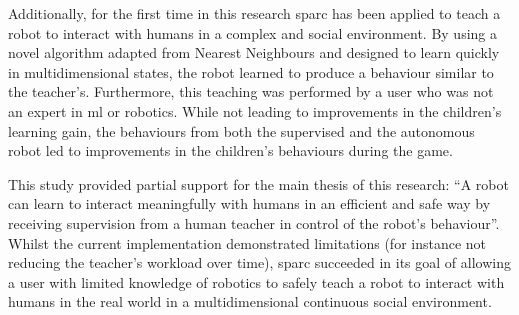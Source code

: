 
Additionally, for the first time in this research \gls{sparc} has been applied to teach a robot to interact with humans in a complex and social environment. By using a novel algorithm adapted from Nearest Neighbours and designed to learn quickly in multidimensional states, the robot learned to produce a behaviour similar to the teacher's. Furthermore, this teaching was performed by a user who was not an expert in \gls{ml} or robotics. While not leading to improvements in the children's learning gain, the behaviours from both the supervised and the autonomous robot led to improvements in the children's behaviours during the game. 

This study provided partial support for the main thesis of this research: ``A robot can learn to interact meaningfully with humans in an efficient and safe way by receiving supervision from a human teacher in control of the robot's behaviour''. Whilst the current implementation demonstrated limitations (for instance not reducing the teacher's workload over time), \gls{sparc} succeeded in its goal of allowing a user with limited knowledge of robotics to safely teach a robot to interact with humans in the real world in a multidimensional continuous social environment. 